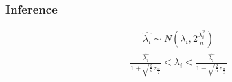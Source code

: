 \documentclass[aspectratio=169,10pt,t]{beamer}
\begin{document}
\begin{frame}[t]
    \frametitle{Inference}
    
    \begin{align*}
        \hat{\lambda_i} \sim N\left(\lambda_i,2\frac{\lambda_i^2}{n}\right) 
    \end{align*}
    \begin{align*}
        \frac{ \hat{\lambda_i}  }{1+ \sqrt{ \frac{2}{n} } z_{\frac{\alpha }{2}}} < \lambda_i < \frac{ \hat{\lambda_i}  }{1- \sqrt{ \frac{2}{n} } z_{\frac{\alpha }{2}}}
    \end{align*}
    
    

\end{frame}
\end{document}
